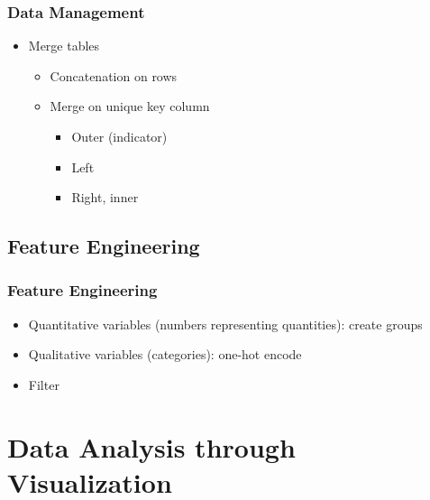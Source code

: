 \begin{frame}\frametitle{Data Management}
   \begin{itemize}
      \item Merge tables
      \begin{itemize}
         \item Concatenation on rows
         \item Merge on unique key column
         \begin{itemize}
            \item Outer (indicator)
            \item Left
            \item Right, inner
         \end{itemize}
      \end{itemize}
   \end{itemize}
\end{frame}


\subsection{Feature Engineering}

\begin{frame}\frametitle{Feature Engineering}
   \begin{itemize}
      \item Quantitative variables (numbers representing quantities): create groups
      \item Qualitative variables (categories): one-hot encode
      \item Filter
   \end{itemize}
\end{frame}


\section{Data Analysis through Visualization}


